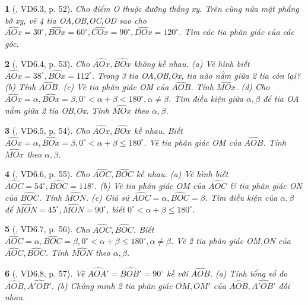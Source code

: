 \documentclass{article}
\newtheorem{baitoan}{}
\begin{document}
\begin{baitoan}[\cite{TLCT_THCS_Toan_6_hinh_hoc}, VD6.3, p. 52]
	Cho điểm O thuộc đường thẳng xy. Trên cùng nửa mặt phẳng bờ xy, vẽ 4 tia OA,OB,OC,OD sao cho $\widehat{AOx} = 30^\circ,\widehat{BOx} = 60^\circ,\widehat{COx} = 90^\circ,\widehat{DOx} = 120^\circ$. Tìm các tia phân giác của các góc.
\end{baitoan}

\begin{baitoan}[\cite{TLCT_THCS_Toan_6_hinh_hoc}, VD6.4, p. 53]
	Cho $\widehat{AOx},\widehat{BOx}$ không kề nhau. (a) Vẽ hình biết $\widehat{AOx} = 38^\circ,\widehat{BOx} = 112^\circ$. Trong 3 tia OA,OB,Ox, tia nào nằm giữa 2 tia còn lại? (b) Tính $\widehat{AOB}$. (c) Vẽ tia phân giác OM của $\widehat{AOB}$. Tính $\widehat{MOx}$. (d) Cho $\widehat{AOx} = \alpha,\widehat{BOx} = \beta,0^\circ < \alpha + \beta < 180^\circ,\alpha\ne\beta$. Tìm điều kiện giữa $\alpha,\beta$ để tia OA nằm giữa 2 tia OB,Ox. Tính $\widehat{MOx}$ theo $\alpha,\beta$.
\end{baitoan}

\begin{baitoan}[\cite{TLCT_THCS_Toan_6_hinh_hoc}, VD6.5, p. 54]
	Cho $\widehat{AOx},\widehat{BOx}$ kề nhau. Biết $\widehat{AOx} = \alpha,\widehat{BOx} = \beta,0^\circ < \alpha + \beta\le180^\circ$. Vẽ tia phân giác OM của $\widehat{AOB}$. Tính $\widehat{MOx}$ theo $\alpha,\beta$.
\end{baitoan}

\begin{baitoan}[\cite{TLCT_THCS_Toan_6_hinh_hoc}, VD6.6, p. 55]
	Cho $\widehat{AOC},\widehat{BOC}$ kề nhau. (a) Vẽ hình biết $\widehat{AOC} = 54^\circ,\widehat{BOC} = 118^\circ$. (b) Vẽ tia phân giác OM của $\widehat{AOC}$ \& tia phân giác ON của $\widehat{BOC}$. Tính $\widehat{MON}$. (c) Giả sử $\widehat{AOC} = \alpha,\widehat{BOC} = \beta$. Tìm điều kiện của $\alpha,\beta$ để $\widehat{MON} = 45^\circ,\widehat{MON} = 90^\circ$, biết $0^\circ < \alpha + \beta\le180^\circ$.
\end{baitoan}

\begin{baitoan}[\cite{TLCT_THCS_Toan_6_hinh_hoc}, VD6.7, p. 56]
	Cho $\widehat{AOC},\widehat{BOC}$. Biết $\widehat{AOC} = \alpha,\widehat{BOC} = \beta,0^\circ < \alpha + \beta\le180^\circ,\alpha\ne\beta$. Vẽ 2 tia phân giác OM,ON của $\widehat{AOC},\widehat{BOC}$. Tính $\widehat{MON}$ theo $\alpha,\beta$.
\end{baitoan}

\begin{baitoan}[\cite{TLCT_THCS_Toan_6_hinh_hoc}, VD6.8, p. 57]
	Vẽ $\widehat{AOA'} = \widehat{BOB'} = 90^\circ$ kề với $\widehat{AOB}$. (a) Tính tổng số đo $\widehat{AOB},\widehat{A'OB'}$. (b) Chứng minh 2 tia phân giác $OM,OM'$ của $\widehat{AOB},\widehat{A'OB'}$ đối nhau.
\end{baitoan}
\end{document}
